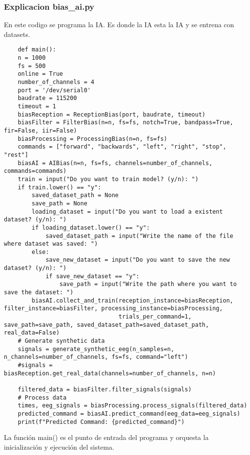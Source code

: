 \documentclass{article}
\begin{document}
\subsubsection{Explicacion bias\_ai.py}
En este codigo se programa la IA. Es donde la IA esta la IA y se entrena con datasets.

\begin{lstlisting}
    def main():
    n = 1000
    fs = 500
    online = True
    number_of_channels = 4
    port = '/dev/serial0'
    baudrate = 115200
    timeout = 1
    biasReception = ReceptionBias(port, baudrate, timeout)
    biasFilter = FilterBias(n=n, fs=fs, notch=True, bandpass=True, fir=False, iir=False)
    biasProcessing = ProcessingBias(n=n, fs=fs)
    commands = ["forward", "backwards", "left", "right", "stop", "rest"]
    biasAI = AIBias(n=n, fs=fs, channels=number_of_channels, commands=commands)
    train = input("Do you want to train model? (y/n): ")
    if train.lower() == "y":
        saved_dataset_path = None
        save_path = None
        loading_dataset = input("Do you want to load a existent dataset? (y/n): ")
        if loading_dataset.lower() == "y":
            saved_dataset_path = input("Write the name of the file where dataset was saved: ")
        else:
            save_new_dataset = input("Do you want to save the new dataset? (y/n): ")
            if save_new_dataset == "y":
                save_path = input("Write the path where you want to save the dataset: ")
        biasAI.collect_and_train(reception_instance=biasReception, filter_instance=biasFilter, processing_instance=biasProcessing, 
                                 trials_per_command=1, save_path=save_path, saved_dataset_path=saved_dataset_path, real_data=False)
    # Generate synthetic data
    signals = generate_synthetic_eeg(n_samples=n, n_channels=number_of_channels, fs=fs, command="left")
    #signals = biasReception.get_real_data(channels=number_of_channels, n=n)
    
    filtered_data = biasFilter.filter_signals(signals)
    # Process data
    times, eeg_signals = biasProcessing.process_signals(filtered_data)
    predicted_command = biasAI.predict_command(eeg_data=eeg_signals)
    print(f"Predicted Command: {predicted_command}")
\end{lstlisting}
La función main() es el punto de entrada del programa y orquesta la inicialización y ejecución del sistema.
\end{document}
